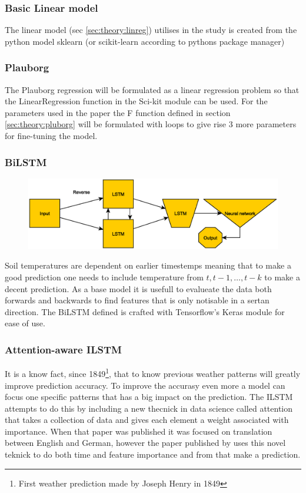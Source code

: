 \subsubsection{Basic Linear model}

The linear model (sec \ref{sec:theory:linreg}) utilises in the study is created from the python model sklearn (or scikit-learn according to pythons package manager) 

\subsubsection{Plauborg}

The Plauborg regression will be formulated as a linear regression problem so that the LinearRegression function in the Sci-kit module can be used. For the parameters used in the paper\cite{plauborg_simple_2002} the F function defined in section \ref{sec:theory:pluborg} will be formulated with loops to give rise 3 more parameters for fine-tuning the model.

\subsubsection{BiLSTM}

\begin{figure}
	\centering
	\includegraphics[width=0.7\linewidth]{figures/BiLSTM}
	\caption{}
	\label{fig:bilstm}
\end{figure}

Soil temperatures are dependent on earlier timestemps meaning that to make a good prediction one needs to include temperature from $t,t-1,\dots,t-k$ to make a decent prediction. As a base model it is usefull to evalueate the data both forwards and backwards to find features that is only notisable in a sertan direction. The BiLSTM defined is crafted with Tensorflow's Keras module for ease of use. 

\subsubsection{Attention-aware ILSTM}

It is a know fact, since 1849\footnote{First weather prediction made by Joseph Henry in 1849}, that to know previous weather patterns will greatly improve prediction accuracy. To improve the accurasy even more a model can focus one specific patterns that has a big impact on the prediction. The ILSTM attempts to do this by including a new thecnick in data science called attention\cite{vaswani_attention_2017} that takes a collection of data and gives each element a weight associated with importance. When that paper was published it was focused on translation between English and German, however the paper published by \citeauthor{li_attention-aware_2022} uses this novel teknick to do both time and feature importance and from that make a prediction.

